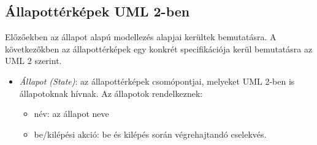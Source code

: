 \subsection{Állapottérképek UML 2-ben}
Előzőekben az állapot alapú modellezés alapjai kerültek bemutatásra. A következőkben az állapottérképek egy konkrét specifikációja kerül bemutatásra az UML 2 szerint.

\begin{itemize}
	\item \emph{Állapot (State)}: az állapottérképek csomópontjai, melyeket UML 2-ben is állapotoknak hívnak. Az állapotok rendelkeznek:
	\begin{itemize}
		\item név: az állapot neve
		\item be/kilépési akció: be és kilépés során végrehajtandó cselekvés.
	\end{itemize}
	

\end{itemize}
